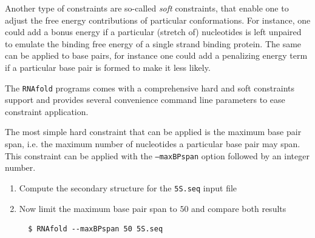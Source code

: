 \documentclass[a4paper]{article}
\begin{document}
Another type of constraints are so-called \textit{soft} constraints, that enable one
to adjust the free energy contributions of particular conformations. For instance,
one could add a bonus energy if a particular (stretch of) nucleotides is left unpaired
to emulate the binding free energy of a single strand binding protein. The same can
be applied to base pairs, for instance one could add a penalizing energy term if a
particular base pair is formed to make it less likely.

The \texttt{RNAfold} programs comes with a comprehensive hard and soft constraints
support and provides several convenience command line parameters to ease constraint
application.

The most simple hard constraint that can be applied is the maximum base pair span, i.e.
the maximum number of nucleotides a particular base pair may span. This constraint can
be applied with the \texttt{--maxBPspan} option followed by an integer number.
\begin{enumerate}
  \item Compute the secondary structure for the \texttt{5S.seq} input file
  \item Now limit the maximum base pair span to $50$ and compare both results
\begin{verbatim}
  $ RNAfold --maxBPspan 50 5S.seq
\end{verbatim}  
\end{enumerate}
\end{document}
